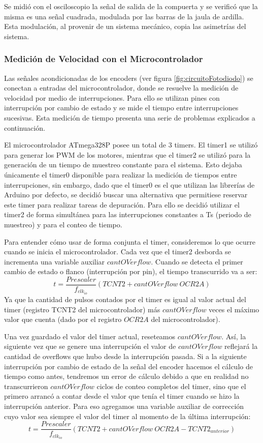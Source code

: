 \documentclass[10pt,conference,a4paper,onecolumn]{article}%
\begin{document}
Se midió con el osciloscopio la señal de salida de la compuerta y se verificó que la misma es una señal cuadrada, modulada por las barras de la jaula de ardilla. Esta modulación, al provenir de un sistema mecánico, copia las asimetrías del sistema.

\subsubsection{Medición de Velocidad con el Microcontrolador}
Las señales acondicionadas de los encoders (ver figura \ref{fig:circuitoFotodiodo}) se conectan a entradas del microcontrolador, donde se resuelve la medición de velocidad por medio de interrupciones. Para ello se utilizan pines con interrupción
por cambio de estado y se mide el tiempo entre interrupciones sucesivas. Esta medición de tiempo presenta una serie de problemas explicados a continuación.

El microcontrolador ATmega328P posee un total de 3 timers. El timer1 se utilizó para generar los PWM de los motores, mientras que el timer2 se utilizó para la generación de un tiempo de muestreo constante para el sistema. Esto dejaba únicamente el timer0 disponible para realizar la medición de tiempos entre interrupciones,
sin embargo, dado que el timer0 es el que utilizan las librerías de Arduino por defecto, se decidió buscar una alternativa que permitiese reservar este timer para realizar tareas de depuración. Para ello se decidió utilizar el timer2 de forma simultánea para las interrupciones constantes a Ts (periodo de muestreo) y para el conteo de tiempo.

Para entender cómo usar de forma conjunta el timer, consideremos lo que ocurre cuando se inicia el microcontrolador. Cada vez que el timer2 desborda se incrementa una variable auxiliar $cantOVerflow$. Cuando se detecta el primer cambio de estado o flanco (interrupción por pin), el tiempo transcurrido va a ser:
 \begin{equation*}
 t=\frac{Prescaler}{f_{clk_{io}}} (TCNT2+cantOVerflow\ OCR2A)
 \end{equation*}
Ya que la cantidad de pulsos contados por el timer es igual al valor actual del timer (registro TCNT2 del microcontrolador) más $cantOVerflow$ veces el máximo valor que cuenta (dado por el registro $OCR2A$ del microcontrolador).

Una vez guardado el valor del timer actual, reseteamos $cantOVerflow$. Así, la siguiente vez que se genere una interrupción el valor de $cantOVerflow$ reflejará la cantidad de overflows que hubo desde la interrupción pasada. Si a la siguiente interrupción por cambio de estado de la señal del encoder hacemos el cálculo de tiempo como
antes, tendremos un error de cálculo debido a que en realidad no transcurrieron $cantOVerflow$ ciclos de conteo completos del timer, sino que el primero arrancó a contar desde el valor que tenía el timer cuando se hizo la interrupción anterior. Para eso agregamos una variable auxiliar de corrección cuyo valor sea siempre el valor del
timer al momento de la última interrupción:
 \begin{equation}
 t=\frac{Prescaler}{f_{clk_{io}}} (TCNT2+cantOVerflow\ OCR2A-TCNT2_{anterior})
 \end{equation}
\end{document}
